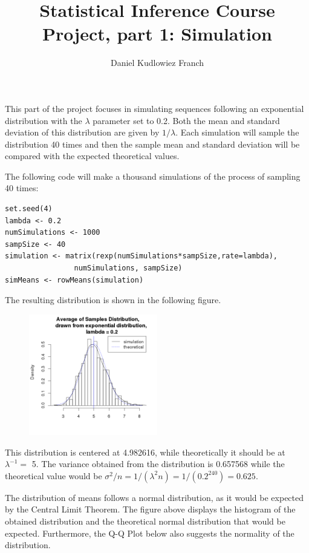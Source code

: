 \documentclass[a4paper]{article}
\title{Statistical Inference Course Project, part 1: Simulation}
\author{Daniel Kudlowiez Franch}
\begin{document}
\maketitle

This part of the project focuses in simulating sequences following an exponential distribution with the $\lambda$ parameter set to 0.2. Both the mean and standard deviation of this distribution are given by $1/\lambda$. Each simulation will sample the distribution 40 times and then the sample mean and standard deviation will be compared with the expected theoretical values.

The following code will make a thousand simulations of the process of sampling 40 times:

\begin{small}
\begin{lstlisting}[frame = single]
set.seed(4)
lambda <- 0.2
numSimulations <- 1000
sampSize <- 40
simulation <- matrix(rexp(numSimulations*sampSize,rate=lambda),
				numSimulations,	sampSize)
simMeans <- rowMeans(simulation)
\end{lstlisting}
\end{small}

The resulting distribution is shown in the following figure.

\begin{figure}[h!]
\centering
\includegraphics[width = 0.5\textwidth]{hist_part_1.png}
\end{figure}

This distribution is centered at 4.982616, while theoretically it should be at $\lambda^{-1} = $ 5. The variance obtained from the distribution is 0.657568 while the theoretical value would be $\sigma^2/n = 1/(\lambda^2n) = 1/(0.2^240) = 0.625$.

The distribution of means follows a normal distribution, as it would be expected by the Central Limit Theorem. The figure above displays the histogram of the obtained distribution and the theoretical normal distribution that would be expected. Furthermore, the Q-Q Plot below also suggests the normality of the distribution.
\end{document}
